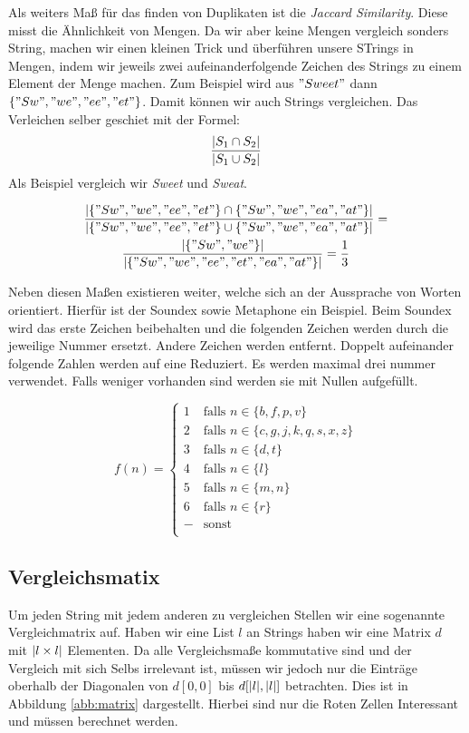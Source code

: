 \documentclass[sigconf]{acmart}
\DeclarePairedDelimiter\abs{\lvert}{\rvert}
\begin{document}
Als weiters Maß für das finden von Duplikaten ist die 
\emph{Jaccard Similarity}. Diese misst die Ähnlichkeit von Mengen.
Da wir aber keine Mengen vergleich sonders String, machen wir einen
kleinen Trick und überführen unsere STrings in Mengen, indem wir 
jeweils zwei aufeinanderfolgende Zeichen des Strings zu einem Element
der Menge machen. Zum Beispiel wird aus $"Sweet"$ dann 
$\{"Sw", "we", "ee", "et" \}$. Damit können wir auch Strings vergleichen.
Das Verleichen selber geschiet mit der Formel:
$$\frac{\abs{S_1 \cap S_2}}{\abs{S_1 \cup S_2}}$$
Als Beispiel vergleich wir \emph{Sweet} und \emph{Sweat}.

\begin{gather*}
  \frac{
    \abs{\{"Sw", "we", "ee", "et" \} \cap \{"Sw", "we", "ea", "at" \}}
  }{
    \abs{\{"Sw", "we", "ee", "et" \} \cup \{"Sw", "we", "ea", "at" \}}
  }
  = \\
  \frac{
    \abs{\{"Sw", "we"\}}
  }{
    \abs{\{"Sw", "we", "ee", "et", "ea", "at" \}}
  }
  = 
  \frac{1}{3}
\end{gather*}

Neben diesen Maßen existieren weiter, welche sich an der 
Aussprache von Worten orientiert. Hierfür ist der Soundex
sowie Metaphone ein Beispiel.
Beim Soundex wird das erste Zeichen beibehalten und die folgenden
Zeichen werden durch die jeweilige Nummer ersetzt. Andere Zeichen werden
entfernt. Doppelt aufeinander folgende Zahlen werden auf eine Reduziert.
Es werden maximal drei nummer verwendet. Falls weniger vorhanden sind 
werden sie mit Nullen aufgefüllt.


\[ f(n) =
  \begin{cases}
    1      & \text{falls } n \in \{b,f,p,v\}\\
    2      & \text{falls } n \in \{c,g,j,k,q,s,x,z\}\\
    3      & \text{falls } n \in \{d,t\}\\
    4      & \text{falls } n \in \{l\}\\
    5      & \text{falls } n \in \{m,n\}\\
    6      & \text{falls } n \in \{r\}\\
    -     & \text{sonst }\\
  \end{cases}
\]




\subsection*{Vergleichsmatix}
Um jeden String mit jedem anderen zu vergleichen Stellen wir eine 
sogenannte Vergleichmatrix auf. Haben wir eine List $l$ an Strings
haben wir eine Matrix $d$ mit $\abs{l\times l}$ Elementen. Da alle 
Vergleichsmaße kommutative sind und der Vergleich mit sich Selbs
irrelevant ist, müssen wir jedoch nur die Einträge oberhalb der 
Diagonalen von $d[0,0]$ bis $d[\abs{l}, \abs{l}]$ betrachten.
Dies ist in Abbildung \ref{abb:matrix} dargestellt. Hierbei 
sind nur die Roten Zellen Interessant und müssen berechnet werden.
\end{document}
